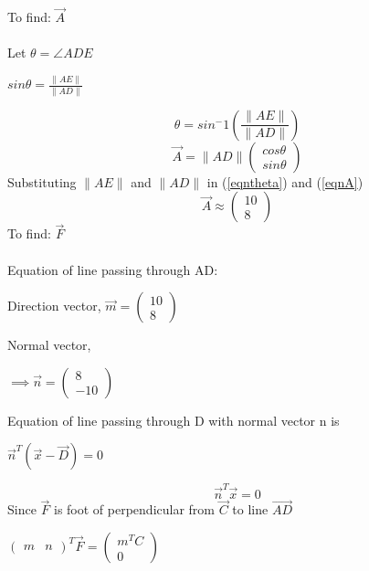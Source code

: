 \documentclass[letterpaper,12pt]{article}
\begin{document}
To find: $\Vec{A}$ \\ \\
Let $\theta = \angle ADE$
\begin{center}
    $sin \theta = \frac{\|AE\|}{\|AD\|}$
\end{center}
\begin{equation}
    \theta = sin^-1\left(\frac{\|AE\|}{\|AD\|}\right)
\label{eqntheta}
\end{equation}
\begin{equation}
    \Vec{A} = \|AD\|\begin{pmatrix} cos \theta \\ sin \theta \end{pmatrix}
\label{eqnA}
\end{equation}
Substituting $\|AE\|$ and $\|AD\|$ in (\ref*{eqntheta}) and (\ref*{eqnA})
\begin{equation}
    \Vec{A} \approx \begin{pmatrix} 10 \\ 8 \end{pmatrix}
\end{equation}
To find: $\Vec{F}$ \\ \\
Equation of line passing through AD:
\begin{center}
    Direction vector, $\Vec{m} = \begin{pmatrix} 10 \\ 8 \end{pmatrix}$
\end{center}
Normal vector,
\begin{center}
    $\implies \Vec{n} = \begin{pmatrix} 8 \\ -10 \end{pmatrix}$
\end{center}
Equation of line passing through D with normal vector n is
\begin{center}
    $\Vec{n}^T(\Vec{x} - \Vec{D}) = 0$
\end{center}
\begin{equation}
    \Vec{n}^T\Vec{x} = 0
\end{equation}
Since $\Vec{F}$ is foot of perpendicular from $\Vec{C}$ to line $\Vec{AD}$
\begin{center}
    $\begin{pmatrix}m & n\end{pmatrix}^T\Vec{F} = \begin{pmatrix} m^TC \\ 0 \end{pmatrix}$
\end{center}
\end{document}
